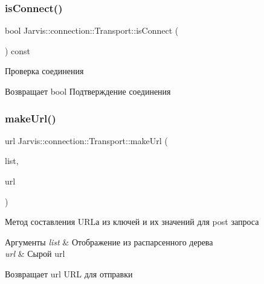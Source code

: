 \subsubsection{\texorpdfstring{is\+Connect()}{isConnect()}}
{\footnotesize\ttfamily bool Jarvis\+::connection\+::\+Transport\+::is\+Connect (\begin{DoxyParamCaption}{ }\end{DoxyParamCaption}) const}



Проверка соединения 

\begin{DoxyReturn}{Возвращает}
bool Подтверждение соединения 
\end{DoxyReturn}
\mbox{\label{classJarvis_1_1connection_1_1Transport_ab08175e845055cdd1ccbe7994f0c1973}} 
\subsubsection{\texorpdfstring{make\+Url()}{makeUrl()}}
{\footnotesize\ttfamily url Jarvis\+::connection\+::\+Transport\+::make\+Url (\begin{DoxyParamCaption}\item[{const j\+List \&}]{list,  }\item[{url \&}]{url }\end{DoxyParamCaption})}



Метод составления U\+RL\textquotesingle{}а из ключей и их значений для post запроса 


\begin{DoxyParams}{Аргументы}
{\em list} & Отображение из распарсенного дерева \\
\hline
{\em url} & Сырой url \\
\hline
\end{DoxyParams}
\begin{DoxyReturn}{Возвращает}
url U\+RL для отправки 
\end{DoxyReturn}
\mbox{\label{classJarvis_1_1connection_1_1Transport_a2cb5e9e28fa84404e8b002c65fe8ecd0}} 
